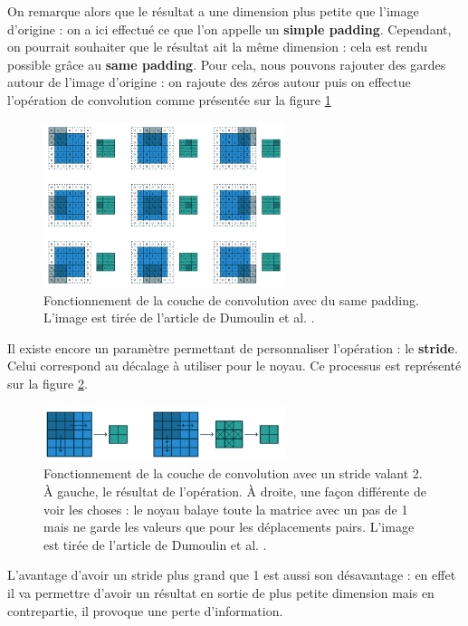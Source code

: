 On remarque alors que le résultat a une dimension plus petite que l'image d'origine : on a ici effectué ce que l'on appelle un \textbf{simple padding}. Cependant, on pourrait souhaiter que le résultat ait la même dimension : cela est rendu possible grâce au \textbf{same padding}. Pour cela, nous pouvons rajouter des gardes autour de l'image d'origine : on rajoute des zéros autour puis on effectue l'opération de convolution comme présentée sur la figure \ref{same_padding}

\begin{figure}[!h]
\centering
\includegraphics[width=200pt]{images/cnn/same_padding.png}
\caption{Fonctionnement de la couche de convolution avec du same padding. L'image est tirée de l'article de Dumoulin et al. \cite{dumoulin_guide_2018}.}
\label{same_padding}
\end{figure}

Il existe encore un paramètre permettant de personnaliser l'opération : le \textbf{stride}. Celui correspond au décalage à utiliser pour le noyau. Ce processus est représenté sur la figure \ref{stride}.

\begin{figure}[!h]
\centering
\includegraphics[width=200pt]{images/cnn/stride.png}
\caption{Fonctionnement de la couche de convolution avec un stride valant 2. À gauche, le résultat de l'opération. À droite, une façon différente de voir les choses : le noyau balaye toute la matrice avec un pas de 1 mais ne garde les valeurs que pour les déplacements pairs. L'image est tirée de l'article de Dumoulin et al. \cite{dumoulin_guide_2018}.}
\label{stride}
\end{figure}
 
L'avantage d'avoir un stride plus grand que 1 est aussi son désavantage : en effet il va permettre d'avoir un résultat en sortie de plus petite dimension mais en contrepartie, il provoque une perte d'information.

